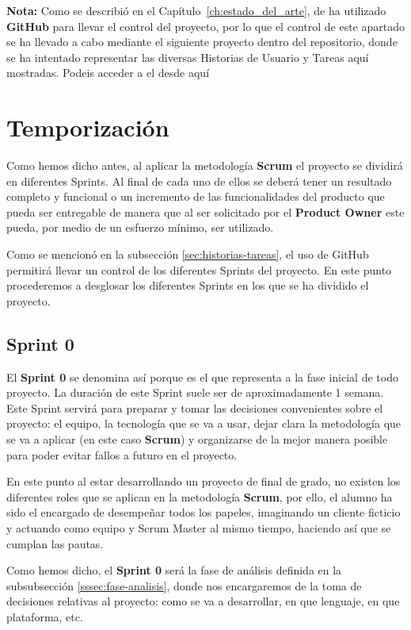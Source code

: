 \textbf{Nota:} Como se describió en el Capítulo~\ref{ch:estado_del_arte}, de ha utilizado \textbf{GitHub} para llevar el control del proyecto, por lo que el control de este apartado se ha llevado a cabo mediante el siguiente proyecto dentro del repositorio, donde se ha intentado representar las diversas Historias de Usuario y Tareas aquí mostradas. Podeis acceder a el desde aquí \cite{proyecto-github}

\section{Temporización}

Como hemos dicho antes, al aplicar la metodología \textbf{Scrum} el proyecto se dividirá en diferentes Sprints. Al final de cada uno de ellos se deberá tener un resultado completo y funcional o un incremento de las funcionalidades del producto que pueda ser entregable de manera que al ser solicitado por el \textbf{Product Owner} este pueda, por medio de un esfuerzo mínimo, ser utilizado.

Como se mencionó en la subsección \ref{sec:historias-tareas}, el uso de GitHub permitirá llevar un control de los diferentes Sprints del proyecto. En este punto procederemos a desglosar los diferentes Sprints en los que se ha dividido el proyecto.

\subsection{Sprint 0}

El \textbf{Sprint 0} se denomina así porque es el que representa a la fase inicial de todo proyecto. La duración de este Sprint suele ser de aproximadamente 1 semana. Este Sprint servirá para preparar y tomar las decisiones convenientes sobre el proyecto: el equipo, la tecnología que se va a usar, dejar clara la metodología que se va a aplicar (en este caso \textbf{Scrum}) y organizarse de la mejor manera posible para poder evitar fallos a futuro en el proyecto.

En este punto al estar desarrollando un proyecto de final de grado, no existen los diferentes roles que se aplican en la metodología \textbf{Scrum}, por ello, el alumno ha sido el encargado de desempeñar todos los papeles, imaginando un cliente ficticio y actuando como equipo y Scrum Master al mismo tiempo, haciendo así que se cumplan las pautas.

Como hemos dicho, el \textbf{Sprint 0} será la fase de análisis definida en la subsubsección \ref{sssec:fase-analisis}, donde nos encargaremos de la toma de decisiones relativas al proyecto: como se va a desarrollar, en que lenguaje, en que plataforma, etc.

